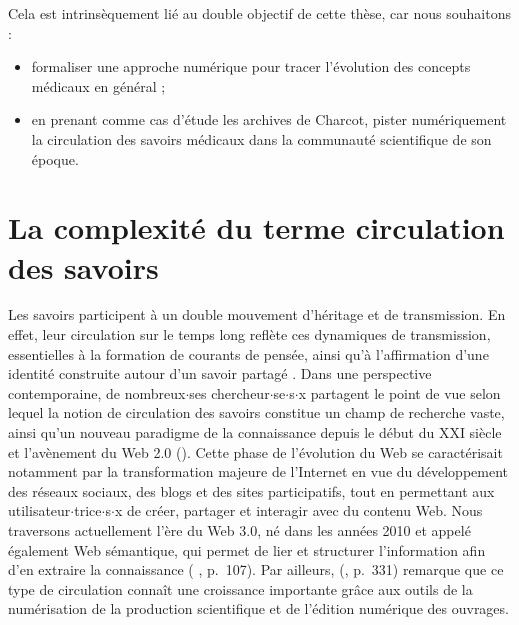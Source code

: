 Cela est intrinsèquement lié au double objectif de cette thèse, car nous souhaitons :
\begin{itemize} 
	\item formaliser une approche numérique pour tracer l'évolution des concepts médicaux en général ;
	\item en prenant comme cas d'étude les archives de Charcot, pister numériquement la circulation des savoirs médicaux dans la communauté scientifique de son époque.
\end{itemize}
\medskip








\section{La complexité du terme \og{}circulation des savoirs\fg{}}
\label{sect:modalites_circulations}
Les savoirs participent à un double mouvement d'héritage et de transmission. En effet, leur circulation sur le temps long reflète ces dynamiques de transmission, essentielles à la formation de courants de pensée, ainsi qu'à l'affirmation d’une identité construite autour d'un savoir partagé \citep[p.~251]{adell2011chapitre}. Dans une perspective contemporaine, de nombreux$\cdot$ses chercheur$\cdot$se$\cdot$s$\cdot$x partagent le point de vue selon lequel la notion de circulation des savoirs constitue un champ de recherche vaste, ainsi qu'un nouveau paradigme de la connaissance depuis le début du XXI\ieme{} siècle et l'avènement du Web \textsc{2.0} (\citealp{landais2014frederic,quet2014frederic}). Cette phase de l'évolution du Web se caractérisait notamment par la transformation majeure de l'Internet en vue du développement des réseaux sociaux, des blogs et des sites participatifs, tout en permettant aux utilisateur$\cdot$trice$\cdot$s$\cdot$x de créer, partager et interagir avec du contenu Web. Nous traversons actuellement l'ère du Web \textsc{3.0}, né dans les années 2010 et appelé également \og{}Web sémantique\fg{}, qui permet de lier et structurer l'information afin d'en extraire la connaissance (\citeauthor{andrade2013sociologie} \citeyear{andrade2013sociologie}, p.~107). Par ailleurs, \citeauthor{landais2014frederic} (\citeyear{landais2014frederic}, p.~331) remarque que ce type de circulation connaît une croissance importante grâce aux outils de la numérisation de la production scientifique et de l'édition numérique des ouvrages.

